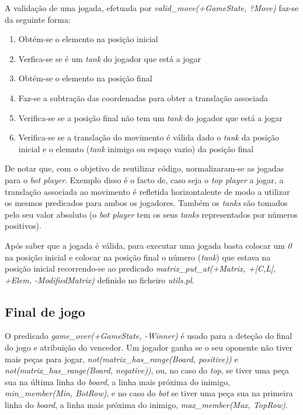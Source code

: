 \documentclass[a4paper,11pt,portuguese]{article}
\begin{document}
    \noindent A validação de uma jogada, efetuada por
    \textit{valid\_move(+GameState, ?Move) } faz-se da seguinte forma:

    \begin{enumerate}[topsep=4pt,itemsep=2pt]
        \item Obtém-se o elemento na posição inicial
        \item Verfica-se se é um \textit{tank} do jogador que está a jogar
        \item Obtém-se o elemento na posição final
        \item Faz-se a subtração das coordenadas para obter a translação associada
        \item Verifica-se se a posição final não tem um \textit{tank} do jogador que
        está a jogar
        \item Verifica-se se a translação do movimento é válida dado o \textit{tank}
        da posição inicial e o elemnto (\textit{tank} inimigo ou espaço vazio) da posição final
    \end{enumerate}

    \noindent De notar que, com o objetivo de reutilizar código, normalizaram-se as jogadas
    para o \textit{bot player}. Exemplo disso é o facto de, caso seja o \textit{top player}
    a jogar, a translação associada ao movimento é refletida horizontalente de modo a utilizar
    os mesmos predicados para ambos os jogadores. Também os \textit{tanks} são tomados pelo seu
    valor absoluto (o \textit{bot player} tem os seus \textit{tanks} representados por números
    positivos).

    Após saber que a jogada é válida, para executar uma jogada basta colocar um \textit{0}
    na posição inicial e colocar na posição final o número (\textit{tank}) que estava na
    posição inicial recorrendo-se ao predicado
    \textit{matrix\_put\_at(+Matrix, +[C,L], +Elem, -ModifiedMatrix) } definido no ficheiro
    \textit{utils.pl}.


    \subsection{Final de jogo}

    O predicado \textit{game\_over(+GameState, -Winner)} é usado para a deteção do final
    do jogo e atribuição do vencedor. Um jogador ganha se o seu oponente não tiver mais 
    peças para jogar, \textit{not(matrix\_has\_range(Board, positive))} e 
    \textit{not(matrix\_has\_range(Board, negative))}, ou, no caso do \textit{top}, se
    tiver uma peça sua na última linha do \textit{board}, a linha mais próxima do inimigo, 
    \textit{min\_member(Min, BotRow)}, e no caso do \textit{bot} se tiver uma peça sua
    na primeira linha do \textit{board}, a linha mais próxima do inimigo, 
    \textit{max\_member(Max, TopRow)}.
\end{document}
